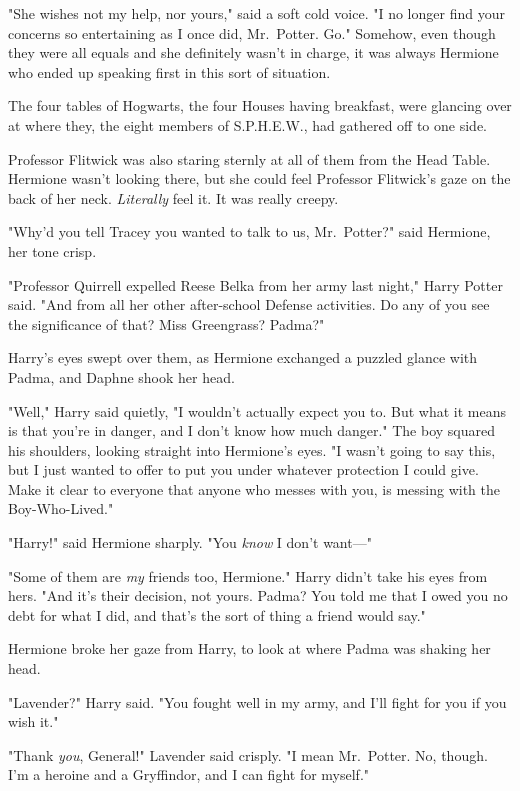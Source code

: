 "She wishes not my help, nor yours," said a soft cold voice. "I no longer find
your concerns so entertaining as I once did, Mr.~Potter. Go."
\sbreak
Somehow, even though they were all equals and she definitely wasn't in charge,
it was always Hermione who ended up speaking first in this sort of situation.

The four tables of Hogwarts, the four Houses having breakfast, were glancing
over at where they, the eight members of S.P.H.E.W., had gathered off to one
side.

Professor Flitwick was also staring sternly at all of them from the Head Table.
Hermione wasn't looking there, but she could feel Professor Flitwick's gaze on
the back of her neck. \emph{Literally} feel it. It was really creepy.

"Why'd you tell Tracey you wanted to talk to us, Mr.~Potter?" said Hermione,
her tone crisp.

"Professor Quirrell expelled Reese Belka from her army last night," Harry
Potter said. "And from all her other after-school Defense activities. Do any of
you see the significance of that? Miss Greengrass? Padma?"

Harry's eyes swept over them, as Hermione exchanged a puzzled glance with
Padma, and Daphne shook her head.

"Well," Harry said quietly, "I wouldn't actually expect you to. But what it
means is that you're in danger, and I don't know how much danger." The boy
squared his shoulders, looking straight into Hermione's eyes. "I wasn't going
to say this, but{\el} I just wanted to offer to put you under whatever
protection I could give. Make it clear to everyone that anyone who messes with
you, is messing with the Boy-Who-Lived."

"Harry!" said Hermione sharply. "You \emph{know} I don't want---"

"Some of them are \emph{my} friends too, Hermione." Harry didn't take his eyes
from hers. "And it's their decision, not yours. Padma? You told me that I owed
you no debt for what I did, and that's the sort of thing a friend would say."

Hermione broke her gaze from Harry, to look at where Padma was shaking her head.

"Lavender?" Harry said. "You fought well in my army, and I'll fight for you if
you wish it."

"Thank \emph{you}, General!" Lavender said crisply. "I mean Mr.~Potter. No,
though. I'm a heroine and a Gryffindor, and I can fight for myself."

